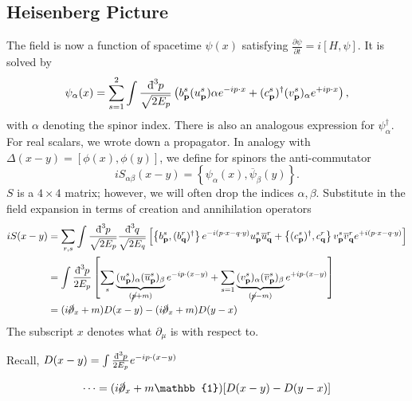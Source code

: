 \subsection*{Heisenberg Picture}%
The field is now a function of spacetime $\psi(x)$ satisfying $\frac{\partial \psi}{\partial t} = i [H, \psi]$. It is solved by
\begin{equation}
  \psi_{\alpha}(x) = \sum_{s=1}^{2} \int \frac{\bdd[3]{p}}{\sqrt{2E_{p}}} \left( b^{s}_{\vb{p}} (u^{s}_{\vb{p}})\alpha e^{-ip \cdot x} + (c^{s}_{\vb{p}})^{\dagger} (v^{s}_{\vb{p}})_{\alpha} e^{+i p \cdot x} \right),
\end{equation}
with $\alpha$ denoting the spinor index.
There is also an analogous expression for $\psi^{\dagger}_{\alpha}$.
For real scalars, we wrote down a propagator. In analogy with $\Delta(x - y) = [\phi(x), \phi(y)]$, we define for spinors the anti-commutator
\begin{equation}
  i S_{\alpha\beta} (x - y) = \left\{ \psi_{\alpha}(x), \overline{\psi}_{\beta}(y) \right\}.
\end{equation}
$S$ is a $4 \times 4$ matrix; however, we will often drop the indices $\alpha, \beta$. 
Substitute in the field expansion in terms of creation and annihilation operators 
\begin{align}
  i S( x - y) &= \sum_{r, s} \int  \frac{\bdd[3]{p}}{\sqrt{2E_{p}}} \frac{\bdd[3]{q}}{\sqrt{2E_{q}}} \left[ \left\{ b^{s}_{\vb{p}}, (b^{r}_{\vb{q}})^{\dagger} \right\} e^{-i (p \cdot x - q \cdot y)} u^{s}_{\vb{p}} \overline{u}^{r}_{\vb{q}}
  + \left\{ (c_{\vb{p}}^{s})^{\dagger} , c^{r}_{\vb{q}} \right\} v^{s}_{\vb{p}} \overline{v}^{r}_{\vb{q}} e^{+i (p \cdot x - q \cdot y)} \right] \\
	      &= \int \frac{\bdd[3]{p}}{2E_{p}} \left[ \sum_{s} \underbrace{(u^{s}_{\vb{p}})_{\alpha} (\overline{u}^{s}_{\vb{p}})_{\beta}}_{\mathclap{(\cancel{p} + m)}} e^{-i p \cdot (x - y)} 
	      + \sum_{s=1} \underbrace{(v^{s}_{\vb{p}})_{\alpha} (\overline{v}^{s}_{\vb{p}})_{\beta}}_{\mathclap{(\cancel{p} - m)}} e^{+i p \cdot ( x- y)} \right] \\
	      &= (i \cancel{\partial}_x + m) D(x - y) - (i \cancel{\partial}_x + m) D(y - x)
\end{align}
The subscript $x$ denotes what $\partial_{\mu}$ is with respect to.
\begin{leftbar}
  \begin{remark}
    Recall, $D(x - y) = \int \frac{\bdd[3]{p}}{2 E_{p}} e^{-i p \cdot (x - y)}$
  \end{remark}
\end{leftbar}
\begin{equation}
  \label{eq:top}
  \dots = (i \cancel{\partial}_x + m \mathbb{1}) [D(x - y) - D(y - x)]
\end{equation}

